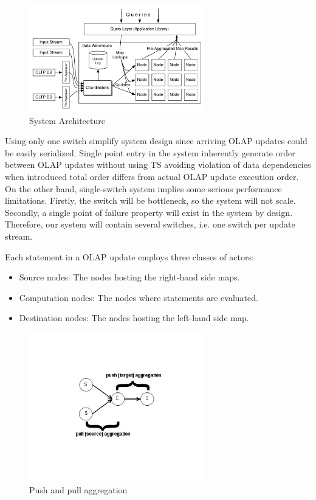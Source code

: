\documentclass{sig-semester}
\def\OLAP{OLAP\xspace}
\def\EXORD{actual OLAP update execution order\xspace}
\begin{document}
\begin{figure}
\includegraphics[width=3in]{graphics/Architecture.pdf}
\vspace{-3mm}
\caption{System Architecture}
\label{fig:architecture}
\vspace{-2mm}
\end{figure}

Using only one switch simplify system design since arriving \OLAP updates could be easily serialized. Single point entry in the system inherently generate order between \OLAP updates without using TS avoiding violation of data dependencies when introduced total order differs from \EXORD. On the other hand, single-switch system implies some serious performance limitations. Firstly, the switch will be bottleneck, so the system will not scale. Secondly, a single point of failure property will exist in the system by design. Therefore, our system will contain several switches, i.e. one switch per update stream.

Each statement in a \OLAP update employs three classes of actors:
\begin{itemize}
 \item Source nodes: The nodes hosting the right-hand side maps.
 \item Computation nodes: The nodes where statements are evaluated.
 \item Destination nodes: The nodes hosting the left-hand side map.
\end{itemize}

\begin{figure}
\begin{center}
\includegraphics[width=3in]{graphics/pushPull.jpg}
\vspace{-21mm}
\caption{Push and pull aggregation}
\label{fig:pushPull}
\vspace{-6mm}
\end{center}
\end{figure}
\end{document}
